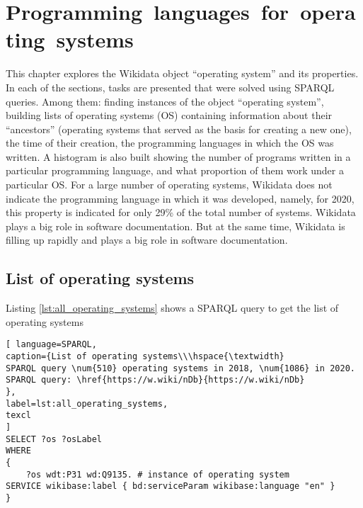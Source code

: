 \setchapterpreamble[u]{\margintoc}
\chapter[Operating systems]{\mbox{Programming languages for operating systems\protect\footnotemark}}


This chapter explores the Wikidata object ``operating system'' and its properties. In each of the sections, tasks are presented that were solved using SPARQL queries. Among them: finding instances of the object ``operating system'', building lists of operating systems (OS) containing information about their ``ancestors'' (operating systems that served as the basis for creating a new one), the time of their creation, the programming languages in which the OS was written.
A histogram is also built showing the number of programs written in a particular programming language, and what proportion of them work under a particular OS. 
For a large number of operating systems, Wikidata does not indicate the programming language in which it was developed, namely, for 2020, this property is indicated for only 29\% of the total number of systems.
Wikidata plays a big role in software documentation. But at the same time, Wikidata is filling up rapidly and plays a big role in software documentation.

\section{List of operating systems}

Listing \ref{lst:all_operating_systems} shows a SPARQL query to get the list of operating systems

\begin{lstlisting}[ language=SPARQL, 
caption={List of operating systems\\\hspace{\textwidth} 
SPARQL query \num{510} operating systems in 2018, \num{1086} in 2020.
SPARQL query: \href{https://w.wiki/nDb}{https://w.wiki/nDb}
},
label=lst:all_operating_systems,
texcl 
]
SELECT ?os ?osLabel
WHERE
{
	?os wdt:P31 wd:Q9135. # instance of operating system
SERVICE wikibase:label { bd:serviceParam wikibase:language "en" }
}
\end{lstlisting}

